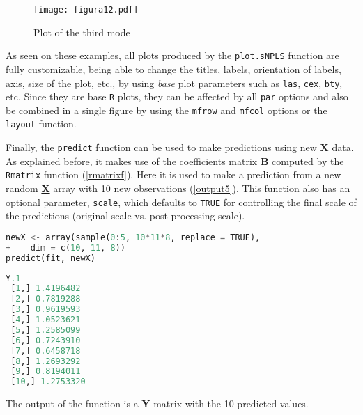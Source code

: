 \begin{figure}[!ht]
	\centering
\texttt{[image: figura12.pdf]}
\caption{Plot of the third mode}
\label{figura12}
\end{figure}
\vspace{10pt}

As seen on these examples, all plots produced by the \texttt{plot.sNPLS} function are fully customizable, being able to change the titles, labels, orientation of labels, axis, size of the plot, etc., by using \textit{base} plot parameters such as \texttt{las}, \texttt{cex}, \texttt{bty}, etc. Since they are base \texttt{R} plots, they can be affected by all \texttt{par} options and also be combined in a single figure by using the \texttt{mfrow} and \texttt{mfcol} options or the \texttt{layout} function.

Finally, the \texttt{predict} function can be used to make predictions using new \textbf{\underline{X}} data. As explained before, it makes use of the coefficients matrix \textbf{B} computed by the \texttt{Rmatrix} function (\autoref{rmatrixf}). Here it is used to make a prediction from a new random \textbf{\underline{X}} array with 10 new observations (\autoref{output5}). This function also has an optional parameter, \texttt{scale}, which defaults to \texttt{TRUE} for controlling the final scale of the predictions (original scale vs. post-processing scale).

\vspace{15pt}
\begin{lstlisting}[basicstyle=\small, language=Python, morekeywords={array, sample, predict}]
newX <- array(sample(0:5, 10*11*8, replace = TRUE), 
+    dim = c(10, 11, 8))
predict(fit, newX)
\end{lstlisting}
\vspace{15pt}
\begin{lstlisting}[basicstyle=\small, backgroundcolor=\color{output}, numbers=none, label={output5}, language=Python, caption=Predictions of the model on new data \texttt{newX}.]
            Y.1
 [1,] 1.4196482
 [2,] 0.7819288
 [3,] 0.9619593
 [4,] 1.0523621
 [5,] 1.2585099
 [6,] 0.7243910
 [7,] 0.6458718
 [8,] 1.2693292
 [9,] 0.8194011
 [10,] 1.2753320
\end{lstlisting}

The output of the function is a \textbf{Y} matrix with the 10 predicted values.

